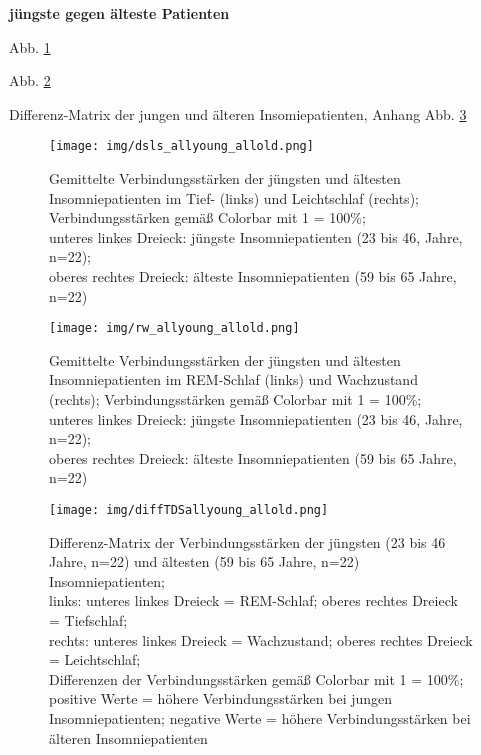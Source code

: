 \textbf{jüngste gegen älteste Patienten}

Abb. \ref{fig:dsls_allyoung_allold}

Abb. \ref{fig:rw_allyoung_allold}

Differenz-Matrix der jungen und älteren Insomiepatienten, Anhang Abb. \ref{fig:diffTDSallyoung_allold}

\begin{figure}[H]
	\centering
	\texttt{[image: img/dsls\_allyoung\_allold.png]}
	\caption[Verbindungsstärken der jüngsten und ältesten Insomniepatienten im Tief- und Leichtschlaf]{Gemittelte Verbindungsstärken der jüngsten und ältesten Insomniepatienten im Tief- (links) und Leichtschlaf (rechts); Verbindungsstärken gemäß Colorbar mit 1 = 100\%;\\unteres linkes Dreieck: jüngste Insomniepatienten (23 bis 46, Jahre, n=22);\\oberes rechtes Dreieck: älteste Insomniepatienten (59 bis 65 Jahre, n=22)}
	\label{fig:dsls_allyoung_allold}
\end{figure}

\begin{figure}[H]
	\centering
	\texttt{[image: img/rw\_allyoung\_allold.png]}
	\caption[Verbindungsstärken der jüngsten und ältesten Insomniepatienten im REM-Schlaf und Wachzustand]{Gemittelte Verbindungsstärken der jüngsten und ältesten Insomniepatienten im REM-Schlaf (links) und Wachzustand (rechts); Verbindungsstärken gemäß Colorbar mit 1 = 100\%;\\unteres linkes Dreieck: jüngste Insomniepatienten (23 bis 46, Jahre, n=22);\\oberes rechtes Dreieck: älteste Insomniepatienten (59 bis 65 Jahre, n=22)}
	\label{fig:rw_allyoung_allold}
\end{figure}

\begin{figure}[H]
	\centering
	\texttt{[image: img/diffTDSallyoung\_allold.png]}
	\caption[Differenz-Matrix der Verbindungsstärken der jungen und älteren Insomniepatienten]{Differenz-Matrix der Verbindungsstärken der jüngsten (23 bis 46 Jahre, n=22) und ältesten (59 bis 65 Jahre, n=22) Insomniepatienten;\\links: unteres linkes Dreieck = REM-Schlaf; oberes rechtes Dreieck = Tiefschlaf;\\rechts: unteres linkes Dreieck = Wachzustand; oberes rechtes Dreieck = Leichtschlaf;\\Differenzen der Verbindungsstärken gemäß Colorbar mit 1 = 100\%;\\positive Werte = höhere Verbindungsstärken bei jungen Insomniepatienten; negative Werte = höhere Verbindungsstärken bei älteren Insomniepatienten}
	\label{fig:diffTDSallyoung_allold}
\end{figure}



